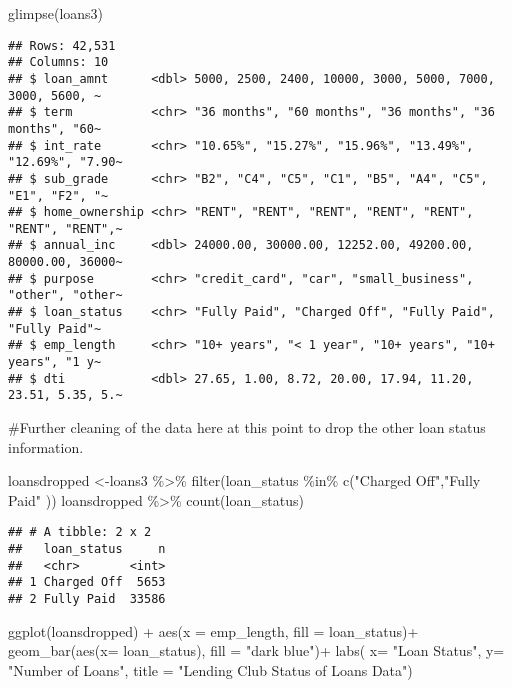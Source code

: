 \documentclass[
]{article}
\newenvironment{Shaded}{\begin{snugshade}}{\end{snugshade}}
\newcommand{\AttributeTok}[1]{\textcolor[rgb]{0.77,0.63,0.00}{#1}}
\newcommand{\FunctionTok}[1]{\textcolor[rgb]{0.00,0.00,0.00}{#1}}
\newcommand{\NormalTok}[1]{#1}
\newcommand{\OtherTok}[1]{\textcolor[rgb]{0.56,0.35,0.01}{#1}}
\newcommand{\SpecialCharTok}[1]{\textcolor[rgb]{0.00,0.00,0.00}{#1}}
\newcommand{\StringTok}[1]{\textcolor[rgb]{0.31,0.60,0.02}{#1}}
\begin{document}
\begin{Shaded}
\begin{Highlighting}[]
\FunctionTok{glimpse}\NormalTok{(loans3)}
\end{Highlighting}
\end{Shaded}

\begin{verbatim}
## Rows: 42,531
## Columns: 10
## $ loan_amnt      <dbl> 5000, 2500, 2400, 10000, 3000, 5000, 7000, 3000, 5600, ~
## $ term           <chr> "36 months", "60 months", "36 months", "36 months", "60~
## $ int_rate       <chr> "10.65%", "15.27%", "15.96%", "13.49%", "12.69%", "7.90~
## $ sub_grade      <chr> "B2", "C4", "C5", "C1", "B5", "A4", "C5", "E1", "F2", "~
## $ home_ownership <chr> "RENT", "RENT", "RENT", "RENT", "RENT", "RENT", "RENT",~
## $ annual_inc     <dbl> 24000.00, 30000.00, 12252.00, 49200.00, 80000.00, 36000~
## $ purpose        <chr> "credit_card", "car", "small_business", "other", "other~
## $ loan_status    <chr> "Fully Paid", "Charged Off", "Fully Paid", "Fully Paid"~
## $ emp_length     <chr> "10+ years", "< 1 year", "10+ years", "10+ years", "1 y~
## $ dti            <dbl> 27.65, 1.00, 8.72, 20.00, 17.94, 11.20, 23.51, 5.35, 5.~
\end{verbatim}

\#Further cleaning of the data here at this point to drop the other loan
status information.

\begin{Shaded}
\begin{Highlighting}[]
\NormalTok{loansdropped }\OtherTok{\textless{}{-}}\NormalTok{loans3 }\SpecialCharTok{\%\textgreater{}\%}
  \FunctionTok{filter}\NormalTok{(loan\_status }\SpecialCharTok{\%in\%} \FunctionTok{c}\NormalTok{(}\StringTok{"Charged Off"}\NormalTok{,}\StringTok{"Fully Paid"}
\NormalTok{                    ))}
\NormalTok{loansdropped }\SpecialCharTok{\%\textgreater{}\%}
  \FunctionTok{count}\NormalTok{(loan\_status)}
\end{Highlighting}
\end{Shaded}

\begin{verbatim}
## # A tibble: 2 x 2
##   loan_status     n
##   <chr>       <int>
## 1 Charged Off  5653
## 2 Fully Paid  33586
\end{verbatim}

\begin{Shaded}
\begin{Highlighting}[]
  \FunctionTok{ggplot}\NormalTok{(loansdropped) }\SpecialCharTok{+}
  \FunctionTok{aes}\NormalTok{(}\AttributeTok{x =}\NormalTok{ emp\_length, }\AttributeTok{fill =}\NormalTok{ loan\_status)}\SpecialCharTok{+}
  \FunctionTok{geom\_bar}\NormalTok{(}\FunctionTok{aes}\NormalTok{(}\AttributeTok{x=}\NormalTok{ loan\_status), }\AttributeTok{fill =} \StringTok{"dark blue"}\NormalTok{)}\SpecialCharTok{+}
\FunctionTok{labs}\NormalTok{( }\AttributeTok{x=} \StringTok{"Loan Status"}\NormalTok{,}
        \AttributeTok{y=} \StringTok{"Number of Loans"}\NormalTok{,}
        \AttributeTok{title =} \StringTok{"Lending Club Status of Loans Data"}\NormalTok{)}
\end{Highlighting}
\end{Shaded}
\end{document}
